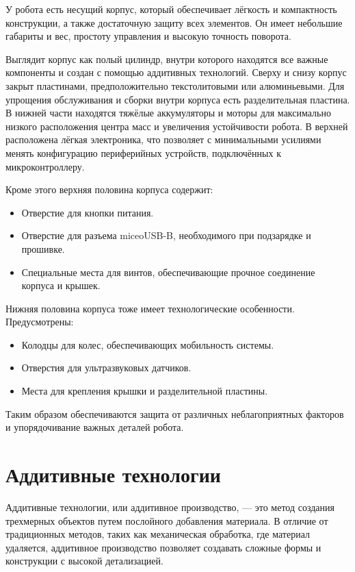 У робота есть несущий корпус, который обеспечивает лёгкость и компактность конструкции, а также достаточную защиту всех элементов. Он имеет небольшие габариты и вес, простоту управления и высокую точность поворота.

Выглядит корпус как полый цилиндр, внутри которого находятся все важные компоненты и создан с помощью аддитивных технологий. Сверху и снизу корпус закрыт пластинами, предположительно текстолитовыми или алюминьевыми. Для упрощения обслуживания и сборки внутри корпуса есть разделительная пластина. В нижней части находятся тяжёлые аккумуляторы и моторы для максимально низкого расположения центра масс и увеличения устойчивости робота. В верхней расположена лёгкая электроника, что позволяет с минимальными усилиями менять конфигурацию периферийных устройств, подключённых к микроконтроллеру.

Кроме этого верхняя половина корпуса содержит:
\begin{itemize}
	\item Отверстие для кнопки питания.
	\item Отверстие для разъема miceoUSB-B, необходимого при подзарядке и прошивке.
	\item Специальные места для винтов, обеспечивающие прочное соединение корпуса и крышек.
\end{itemize}

Нижняя половина корпуса тоже имеет технологические особенности. Предусмотрены:
\begin{itemize}
	\item Колодцы для колес, обеспечивающих мобильность системы.
	\item Отверстия для ультразвуковых датчиков.
	\item Места для крепления крышки и разделительной пластины.
\end{itemize}


Таким образом обеспечиваются защита от различных неблагоприятных факторов и упорядочивание важных деталей робота.

\section{Аддитивные технологии}

Аддитивные технологии, или аддитивное производство, --- это метод создания трехмерных объектов путем послойного добавления материала. В отличие от традиционных методов, таких как механическая обработка, где материал удаляется, аддитивное производство позволяет создавать сложные формы и конструкции с высокой детализацией.

